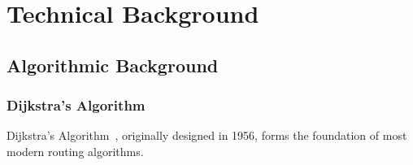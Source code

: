 \documentclass[ %
                    author={Alexander Hill},
                supervisor={Dr. Benjamin Sach},
                    degree={MEng},
                     title={MARMOSET},
                  subtitle={Multi-Agent Route Management using Online Simulation for Efficient Transportation},
                      type={research},
                      year={2016} ]{dissertation}
\begin{document}




\chapter{Technical Background}
\label{chap:technical}


\section{Algorithmic Background}

\subsection{Dijkstra's Algorithm}

Dijkstra's Algorithm~\cite{dijkstra}, originally designed in 1956, forms the
foundation of most modern routing algorithms.
\end{document}
